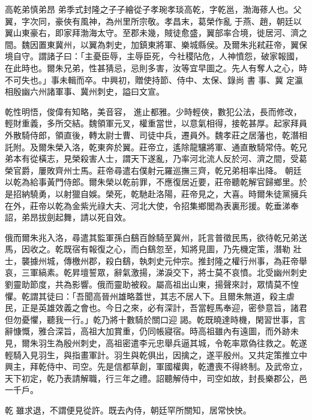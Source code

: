 
\begin{pinyinscope}

 高乾弟慎弟昂
 弟季式封隆之子子繪從子孝琬孝琰高乾，字乾邕，渤海蓚人也。父翼，字次同，豪俠有風神，為州里所宗敬。孝昌末，葛榮作亂
 于燕、趙，朝廷以翼山東豪右，即家拜渤海太守。至郡未幾，賊徒愈盛，翼部率合境，徙居河、濟之間。魏因置東冀州，以翼為刺史，加鎮東將軍、樂城縣侯。及爾朱兆弒莊帝，翼保境自守。謂諸子曰：「主憂臣辱，主辱臣死，今社稷阽危，人神憤怨，破家報國，在此時也。爾朱兄弟，性甚猜忌，忌則多害，汝等宜早圖之。先人有奪人之心，時不可失也。」事未輯而卒。中興初，贈使持節、侍中、太保、錄尚
 書
 事、冀
 定瀛相殷幽六州諸軍事、冀州刺史，謚曰文宣。



 乾性明悟，俊偉有知略，美音容，
 進止都雅。少時輕俠，數犯公法，長而修改，輕財重義，多所交結。魏領軍元叉，權重當世，以意氣相得，接乾甚厚。起家拜員外散騎侍郎，領直後，轉太尉士曹、司徒中兵，遷員外。魏孝莊之居藩也，乾潛相託附。及爾朱榮入洛，乾東奔於翼。莊帝立，遙除龍驤將軍、通直散騎常侍。乾兄弟本有從橫志，見榮殺害人士，謂天下遂亂，乃率河北流人反於河、濟之間，受葛榮官爵，屢敗齊州士馬。莊帝尋遣右僕射元羅巡撫三齊，乾兄弟相率出降。
 朝廷以乾為給事黃門侍郎。爾朱榮以乾前罪，不應復居近要，莊帝聽乾解官歸鄉里。於是招納驍勇，以射獵自娛。榮死，乾馳赴洛陽，莊帝見之，大喜。時爾朱徒黨擁兵在外，莊帝以乾為金紫光祿大夫、河北大使，令招集鄉閭為表裏形援。乾垂涕奉詔，弟昂拔劍起舞，請以死自效。



 俄而爾朱兆入洛，尋遣其監軍孫白鷂百餘騎至冀州，託言普徵民馬，欲待乾兄弟送馬，因收之。乾既宿有報復之心，而白鷂忽至，知將見圖，乃先機定策，潛勒
 壯士，襲據州城，傳檄州郡，殺白鷂，執刺史元仲宗。推封隆之權行州事，為莊帝舉哀，三軍縞素。乾昇壇誓眾，辭氣激揚，涕淚交下，將士莫不哀憤。北受幽州刺史劉靈助節度，共為影響。俄而靈助被殺。屬高祖出山東，揚聲來討，眾情莫不惶懼。乾謂其徒曰：「吾聞高晉州雄略蓋世，其志不居人下。且爾朱無道，殺主虐民，正是英雄效義之會也。今日之來，必有深計，吾當輕馬奉迎，密參意旨，諸君但勿憂懼，聽我一行。」乾乃將十數騎於關口迎
 謁。乾既曉達時機，閑習世事，言辭慷慨，雅合深旨，高祖大加賞重，仍同帳寢宿。時高祖雖內有遠圖，而外跡未見，爾朱羽生為殷州刺史，高祖密遣李元忠舉兵逼其城，令乾率眾偽往救之。乾遂輕騎入見羽生，與指畫軍計。羽生與乾俱出，因擒之，遂平殷州。又共定策推立中興主，拜乾侍中、司空。先是信都草創，軍國權輿，乾遭喪不得終制。及武帝立，天下初定，乾乃表請解職，行三年之禮。詔聽解侍中，司空如故，封長樂郡公，邑一千戶。



 乾
 雖求退，不謂便見從許。既去內侍，朝廷罕所關知，居常怏怏。




\end{pinyinscope}
